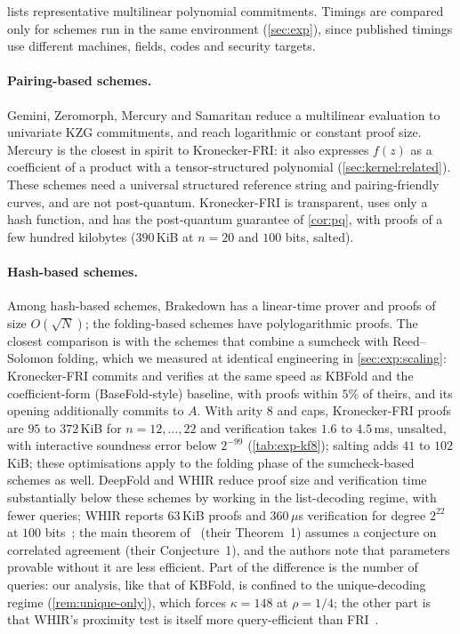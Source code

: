  lists representative multilinear polynomial commitments.
Timings are compared only for schemes run in the same environment (\cref{sec:exp}), since published timings use different machines, fields, codes and security targets.

\paragraph{Pairing-based schemes.}
Gemini, Zeromorph, Mercury and Samaritan reduce a multilinear evaluation to univariate KZG commitments, and reach logarithmic or constant proof size.
Mercury is the closest in spirit to Kronecker-FRI: it also expresses $f(z)$ as a coefficient of a product with a tensor-structured polynomial (\cref{sec:kernel:related}).
These schemes need a universal structured reference string and pairing-friendly curves, and are not post-quantum. Kronecker-FRI is transparent, uses only a hash function, and has the post-quantum guarantee of \cref{cor:pq}, with proofs of a few hundred kilobytes ($390$\,KiB at $n = 20$ and $100$ bits, salted).

\paragraph{Hash-based schemes.}
Among hash-based schemes, Brakedown has a linear-time prover and proofs of size $O(\sqrt N)$; the folding-based schemes have polylogarithmic proofs.
The closest comparison is with the schemes that combine a sumcheck with Reed--Solomon folding, which we measured at identical engineering in \cref{sec:exp:scaling}: Kronecker-FRI commits and verifies at the same speed as KBFold and the coefficient-form (BaseFold-style) baseline, with proofs within $5\%$ of theirs, and its opening additionally commits to $A$. With arity $8$ and caps, Kronecker-FRI proofs are $95$ to $372$\,KiB for $n = 12, \dots, 22$ and verification takes $1.6$ to $4.5$\,ms, unsalted, with interactive soundness error below $2^{-99}$ (\cref{tab:exp-kf8}); salting adds $41$ to $102$\,KiB; these optimisations apply to the folding phase of the sumcheck-based schemes as well.
DeepFold and WHIR reduce proof size and verification time substantially below these schemes by working in the list-decoding regime, with fewer queries; WHIR reports $63$\,KiB proofs and $360\,\mu$s verification for degree $2^{22}$ at $100$ bits~\cite{ACFY24}; the main theorem of~\cite{ACFY24} (their Theorem~1) assumes a conjecture on correlated agreement (their Conjecture~1), and the authors note that parameters provable without it are less efficient.
Part of the difference is the number of queries: our analysis, like that of KBFold, is confined to the unique-decoding regime (\cref{rem:unique-only}), which forces $\kappa = 148$ at $\rho = 1/4$; the other part is that WHIR's proximity test is itself more query-efficient than FRI~\cite{ACFY24}.

